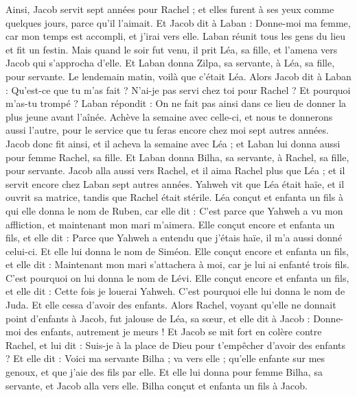 \begin{multicols}{2}
Ainsi, Jacob servit sept années pour Rachel ; et elles furent à ses yeux comme quelques jours, parce qu'il l'aimait.
Et Jacob dit à Laban : Donne-moi ma femme, car mon temps est accompli, et j'irai vers elle.
Laban réunit tous les gens du lieu et fit un festin.
Mais quand le soir fut venu, il prit Léa, sa fille, et l'amena vers Jacob qui s'approcha d'elle.
Et Laban donna Zilpa, sa servante, à Léa, sa fille, pour servante.
Le lendemain matin, voilà que c'était Léa. Alors Jacob dit à Laban : Qu'est-ce que tu m'as fait ? N'ai-je pas servi chez toi pour Rachel ? Et pourquoi m'as-tu trompé ?
Laban répondit : On ne fait pas ainsi dans ce lieu de donner la plus jeune avant l'aînée.
Achève la semaine avec celle-ci, et nous te donnerons aussi l'autre, pour le service que tu feras encore chez moi sept autres années.
Jacob donc fit ainsi, et il acheva la semaine avec Léa ; et Laban lui donna aussi pour femme Rachel, sa fille.
Et Laban donna Bilha, sa servante, à Rachel, sa fille, pour servante.
Jacob alla aussi vers Rachel, et il aima Rachel plus que Léa ; et il servit encore chez Laban sept autres années.
Yahweh vit que Léa était haïe, et il ouvrit sa matrice, tandis que Rachel était stérile.
Léa conçut et enfanta un fils à qui elle donna le nom de Ruben, car elle dit : C'est parce que Yahweh a vu mon affliction, et maintenant mon mari m'aimera.
Elle conçut encore et enfanta un fils, et elle dit : Parce que Yahweh a entendu que j'étais haïe, il m'a aussi donné celui-ci. Et elle lui donna le nom de Siméon.
Elle conçut encore et enfanta un fils, et elle dit : Maintenant mon mari s'attachera à moi, car je lui ai enfanté trois fils. C'est pourquoi on lui donna le nom de Lévi.
Elle conçut encore et enfanta un fils, et elle dit : Cette fois je louerai Yahweh. C'est pourquoi elle lui donna le nom de Juda. Et elle cessa d'avoir des enfants.
\VerseOne{}Alors Rachel, voyant qu'elle ne donnait point d'enfants à Jacob, fut jalouse de Léa, sa sœur, et elle dit à Jacob : Donne-moi des enfants, autrement je meurs !
Et Jacob se mit fort en colère contre Rachel, et lui dit : Suis-je à la place de Dieu pour t'empêcher d'avoir des enfants ?
Et elle dit : Voici ma servante Bilha ; va vers elle ; qu'elle enfante sur mes genoux, et que j'aie des fils par elle.
Et elle lui donna pour femme Bilha, sa servante, et Jacob alla vers elle.
Bilha conçut et enfanta un fils à Jacob.

\end{multicols}
